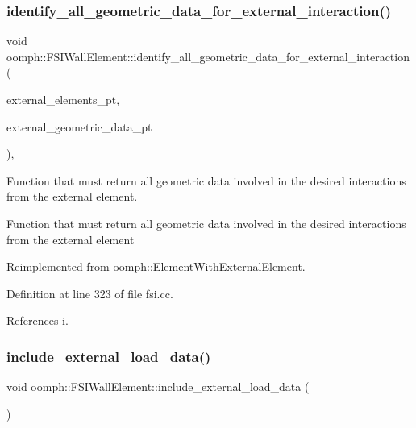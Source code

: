 \subsubsection{\texorpdfstring{identify\+\_\+all\+\_\+geometric\+\_\+data\+\_\+for\+\_\+external\+\_\+interaction()}{identify\_all\_geometric\_data\_for\_external\_interaction()}}
{\footnotesize\ttfamily void oomph\+::\+F\+S\+I\+Wall\+Element\+::identify\+\_\+all\+\_\+geometric\+\_\+data\+\_\+for\+\_\+external\+\_\+interaction (\begin{DoxyParamCaption}\item[{\hyperlink{classoomph_1_1Vector}{Vector}$<$ std\+::set$<$ \hyperlink{classoomph_1_1FiniteElement}{Finite\+Element} $\ast$$>$ $>$ const \&}]{external\+\_\+elements\+\_\+pt,  }\item[{std\+::set$<$ \hyperlink{classoomph_1_1Data}{Data} $\ast$$>$ \&}]{external\+\_\+geometric\+\_\+data\+\_\+pt }\end{DoxyParamCaption})\hspace{0.3cm}{\ttfamily [private]}, {\ttfamily [virtual]}}



Function that must return all geometric data involved in the desired interactions from the external element. 

Function that must return all geometric data involved in the desired interactions from the external element 

Reimplemented from \hyperlink{classoomph_1_1ElementWithExternalElement_aa6d8ce7d46edf8fc06557776663af172}{oomph\+::\+Element\+With\+External\+Element}.



Definition at line 323 of file fsi.\+cc.



References i.

\mbox{\label{classoomph_1_1FSIWallElement_a5e976f5a5d1d9f95b349ff532070bd78}} 
\subsubsection{\texorpdfstring{include\+\_\+external\+\_\+load\+\_\+data()}{include\_external\_load\_data()}}
{\footnotesize\ttfamily void oomph\+::\+F\+S\+I\+Wall\+Element\+::include\+\_\+external\+\_\+load\+\_\+data (\begin{DoxyParamCaption}{ }\end{DoxyParamCaption})\hspace{0.3cm}{\ttfamily [inline]}}



